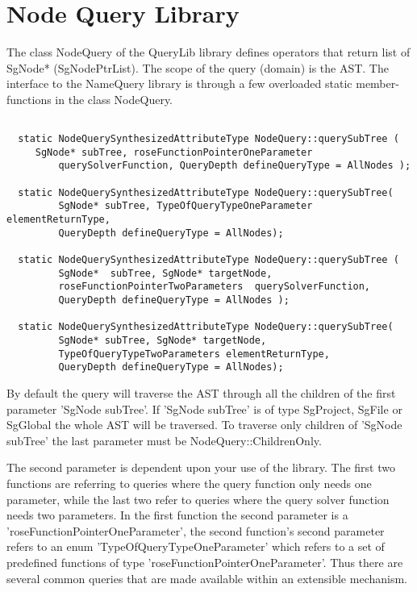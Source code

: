 {\section{Node Query Library}
 
The class NodeQuery of the QueryLib library defines operators that 
return list of SgNode* (SgNodePtrList). The scope of the query (domain) is
the AST. The interface to the NameQuery library is through a few
overloaded static member-functions in the class NodeQuery.

\begin{verbatim}

  static NodeQuerySynthesizedAttributeType NodeQuery::querySubTree (
	 SgNode* subTree, roseFunctionPointerOneParameter 
         querySolverFunction, QueryDepth defineQueryType = AllNodes );

  static NodeQuerySynthesizedAttributeType NodeQuery::querySubTree( 
         SgNode* subTree, TypeOfQueryTypeOneParameter elementReturnType,
         QueryDepth defineQueryType = AllNodes);
	 	
  static NodeQuerySynthesizedAttributeType NodeQuery::querySubTree (
         SgNode*  subTree, SgNode* targetNode,
         roseFunctionPointerTwoParameters  querySolverFunction,
         QueryDepth defineQueryType = AllNodes );
	  
  static NodeQuerySynthesizedAttributeType NodeQuery::querySubTree( 
         SgNode* subTree, SgNode* targetNode, 
         TypeOfQueryTypeTwoParameters elementReturnType, 
         QueryDepth defineQueryType = AllNodes);

\end{verbatim}

By default the query will traverse the AST through all the children of the
first parameter 'SgNode subTree'. If 'SgNode subTree' is of type SgProject, 
SgFile or SgGlobal the whole AST will be traversed. To traverse only children
of 'SgNode subTree' the last parameter must be NodeQuery::ChildrenOnly.

The second parameter is dependent upon your use of the library. The
first two functions are referring to queries where the query function
only needs one parameter, while the last two refer to queries where the 
query solver function needs two parameters. In the first function the second
parameter is a 'roseFunctionPointerOneParameter', the second function's
second parameter refers to an enum 'TypeOfQueryTypeOneParameter' which 
refers to a set of predefined functions of type 
'roseFunctionPointerOneParameter'. Thus there are several common queries that
are made available within an extensible mechanism.

}
